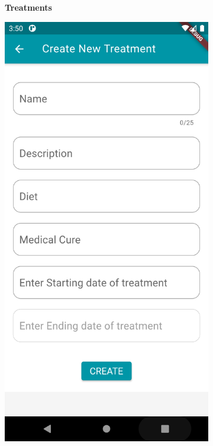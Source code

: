 \documentclass [12pt]{article}
\begin{document}
\begin{description}[leftmargin=1cm,rightmargin=1cm]
\begin{figure}[h!]
\begin{subfigure}[tl]{0.3\linewidth}
\caption{\textbf{Treatments}}
\end{subfigure}\hfill
\begin{subfigure}[tr]{0.3\linewidth}
\includegraphics[width=\linewidth]{treatments4.PNG}

\end{subfigure}
\end{figure}
\end{description}
\end{document}
